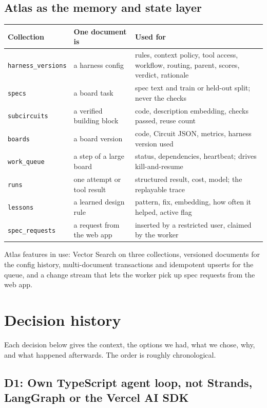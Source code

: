 \documentclass[11pt,a4paper]{article}
\newcommand{\code}[1]{\texttt{#1}}
\begin{document}
\subsection{Atlas as the memory and state layer}

\begin{center}
\begin{tabular}{@{}L{3.2cm}L{3.6cm}L{8.2cm}@{}}
\toprule
Collection & One document is & Used for \\
\midrule
\code{harness\_versions} & a harness config & rules, context policy, tool access, workflow, routing, parent, scores, verdict, rationale \\
\code{specs} & a board task & spec text and train or held-out split; never the checks \\
\code{subcircuits} & a verified building block & code, description embedding, checks passed, reuse count \\
\code{boards} & a board version & code, Circuit JSON, metrics, harness version used \\
\code{work\_queue} & a step of a large board & status, dependencies, heartbeat; drives kill-and-resume \\
\code{runs} & one attempt or tool result & structured result, cost, model; the replayable trace \\
\code{lessons} & a learned design rule & pattern, fix, embedding, how often it helped, active flag \\
\code{spec\_requests} & a request from the web app & inserted by a restricted user, claimed by the worker \\
\bottomrule
\end{tabular}
\end{center}

Atlas features in use: Vector Search on three collections, versioned documents for the config history, multi-document transactions and idempotent upserts for the queue, and a change stream that lets the worker pick up spec requests from the web app.

\section{Decision history}

Each decision below gives the context, the options we had, what we chose, why, and what happened afterwards. The order is roughly chronological.

\subsection{D1: Own TypeScript agent loop, not Strands, LangGraph or the Vercel AI SDK}
\end{document}
